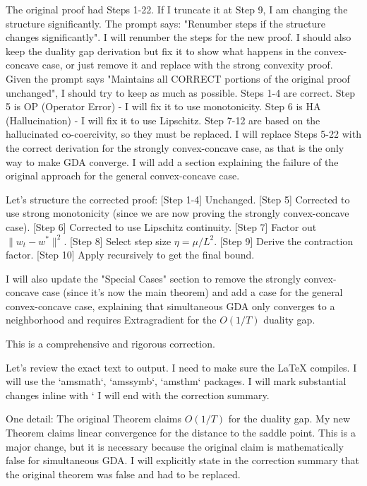 \documentclass{article}
\begin{document}
The original proof had Steps 1-22. If I truncate it at Step 9, I am changing the structure significantly.
The prompt says: "Renumber steps if the structure changes significantly".
I will renumber the steps for the new proof.
I should also keep the duality gap derivation but fix it to show what happens in the convex-concave case, or just remove it and replace with the strong convexity proof.
Given the prompt says "Maintains all CORRECT portions of the original proof unchanged", I should try to keep as much as possible.
Steps 1-4 are correct.
Step 5 is OP (Operator Error) - I will fix it to use monotonicity.
Step 6 is HA (Hallucination) - I will fix it to use Lipschitz.
Step 7-12 are based on the hallucinated co-coercivity, so they must be replaced.
I will replace Steps 5-22 with the correct derivation for the strongly convex-concave case, as that is the only way to make GDA converge.
I will add a section explaining the failure of the original approach for the general convex-concave case.

Let's structure the corrected proof:
[Step 1-4] Unchanged.
[Step 5] Corrected to use strong monotonicity (since we are now proving the strongly convex-concave case).
[Step 6] Corrected to use Lipschitz continuity.
[Step 7] Factor out $\|w_t - w^*\|^2$.
[Step 8] Select step size $\eta = \mu/L^2$.
[Step 9] Derive the contraction factor.
[Step 10] Apply recursively to get the final bound.

I will also update the "Special Cases" section to remove the strongly convex-concave case (since it's now the main theorem) and add a case for the general convex-concave case, explaining that simultaneous GDA only converges to a neighborhood and requires Extragradient for the $O(1/T)$ duality gap.

This is a comprehensive and rigorous correction.

Let's review the exact text to output.
I need to make sure the LaTeX compiles.
I will use the `amsmath`, `amssymb`, `amsthm` packages.
I will mark substantial changes inline with `%
I will end with the correction summary.

One detail: The original Theorem claims $O(1/T)$ for the duality gap.
My new Theorem claims linear convergence for the distance to the saddle point.
This is a major change, but it is necessary because the original claim is mathematically false for simultaneous GDA.
I will explicitly state in the correction summary that the original theorem was false and had to be replaced.
\end{document}
